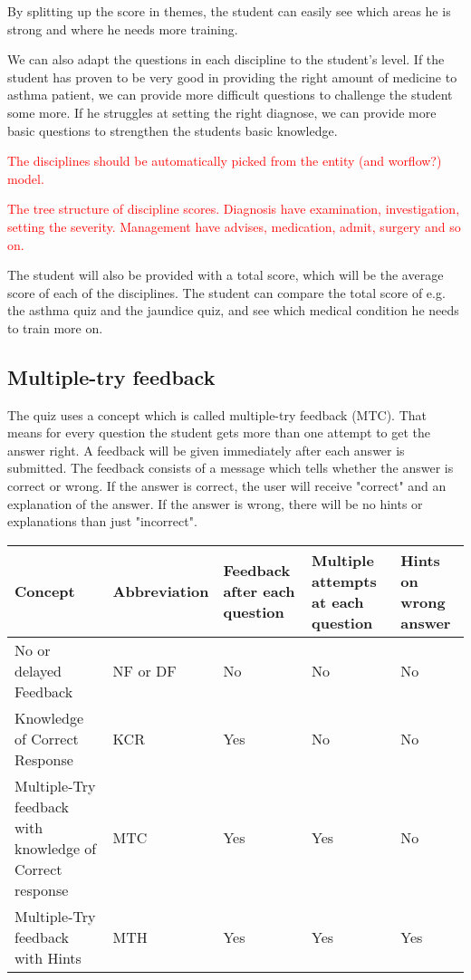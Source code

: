 \documentclass[a4paper,12pt]{book}
\begin{document}
By splitting up the score in themes, the student can easily see which areas he is strong and where he needs more training. 



We can also adapt the questions in each discipline to the student's level. If the student has proven to be very good in providing the right amount of medicine to asthma patient, we can provide more difficult questions to challenge the student some more. If he struggles at setting the right diagnose, we can provide more basic questions to strengthen the students basic knowledge. 

\textcolor{red}{The disciplines should be automatically picked from the entity (and worflow?) model.}

\textcolor{red}{The tree structure of discipline scores. Diagnosis have examination, investigation, setting the severity. Management have advises, medication, admit, surgery and so on.}




The student will also be provided with a total score, which will be the average score of each of the disciplines. The student can compare the total score of e.g. the asthma quiz and the jaundice quiz, and see which medical condition he needs to train more on.

\subsection{Multiple-try feedback}
The quiz uses a concept which is called multiple-try feedback (MTC). That means for every question the student gets more than one attempt to get the answer right. A feedback will be given immediately after each answer is submitted. The feedback consists of a message which tells whether the answer is correct or wrong. If the answer is correct, the user will receive "correct" and an explanation of the answer. If the answer is wrong, there will be no hints or explanations than just "incorrect".

\begin{tabular}{ | m{10em} | m{6em}| m{6em} | m{6em} | m{5em} | } 
	\hline
	Concept & Abbreviation & Feedback after each question & Multiple attempts at each question & Hints on wrong answer \\ [0.5ex]
	\hline
No or delayed Feedback & NF or DF & No & No & No  \\
Knowledge of Correct Response & KCR  & Yes & No & No \\
Multiple-Try feedback with knowledge of Correct response  & MTC & Yes & Yes & No \\
Multiple-Try feedback with Hints & MTH & Yes & Yes & Yes \\
\hline
\end{tabular}
\end{document}
